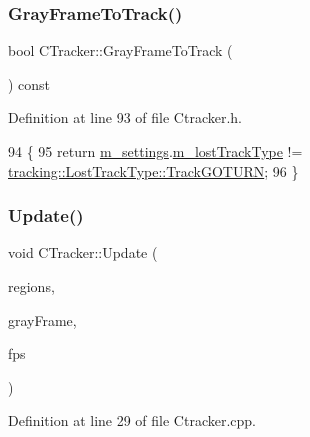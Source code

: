 \subsubsection{\texorpdfstring{Gray\+Frame\+To\+Track()}{GrayFrameToTrack()}}
{\footnotesize\ttfamily bool C\+Tracker\+::\+Gray\+Frame\+To\+Track (\begin{DoxyParamCaption}{ }\end{DoxyParamCaption}) const\hspace{0.3cm}{\ttfamily [inline]}}



Definition at line 93 of file Ctracker.\+h.


\begin{DoxyCode}
94     \{
95         \textcolor{keywordflow}{return} \mbox{\hyperlink{class_c_tracker_acb84aee0d550f4cdadbfac6735811050}{m\_settings}}.\mbox{\hyperlink{struct_tracker_settings_a61a59f1c5bcc2ee76cef1b174d4bb8a4}{m\_lostTrackType}} != 
      \mbox{\hyperlink{namespacetracking_a5377d69122ad915004ef68a518d22be3a674ec8effe560545c87b0c14bd40f7f3}{tracking::LostTrackType::TrackGOTURN}};
96     \}
\end{DoxyCode}
\mbox{\label{class_c_tracker_aad6f4e7a80a1b71522644a1f8c052f21}} 
\subsubsection{\texorpdfstring{Update()}{Update()}}
{\footnotesize\ttfamily void C\+Tracker\+::\+Update (\begin{DoxyParamCaption}\item[{const \mbox{\hyperlink{defines_8h_a01db0de56a20f4342820a093c5154536}{regions\+\_\+t}} \&}]{regions,  }\item[{cv\+::\+U\+Mat}]{gray\+Frame,  }\item[{float}]{fps }\end{DoxyParamCaption})}



Definition at line 29 of file Ctracker.\+cpp.


